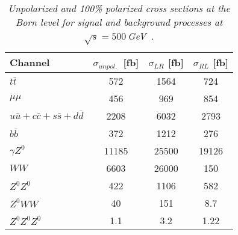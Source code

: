         \begin{table}
        \begin{center}
        \begin{tabular}{l c c c}
        \hline
	Channel & $\sigma_{unpol.}$\ [fb] & $\sigma_{LR}$ [fb] &  $\sigma_{RL}$ [fb] \\
	\hline
	$t\bar{t}$ & 572 & 1564 & 724 \\
	\hline
	$\mu\mu$ & 456 & 969 & 854 \\
	$u\bar{u} + c\bar{c} + s\bar{s} + d\bar{d}$ & 2208 & 6032 & 2793 \\
	$b\bar{b}$ & 372 & 1212 & 276 \\
	$\gamma Z^0$ & 11185 & 25500 & 19126 \\
	$WW$ & 6603 & 26000 & 150 \\ 
	$Z^0Z^0$ & 422 & 1106 & 582 \\
	$Z^0WW$ & 40 & 151 & 8.7 \\
	$Z^0 Z^0 Z^0$ & 1.1 & 3.2 & 1.22 \\
        \hline
        \end{tabular}
        \end{center}
        \caption{\sl Unpolarized and 100\% polarized cross sections at the Born level for signal and background processes at $\sqrt{s}=500$\,GeV~\cite{bib:ILCTOP}. }
        \label{table:ttbarsigma}
        \end{table}
